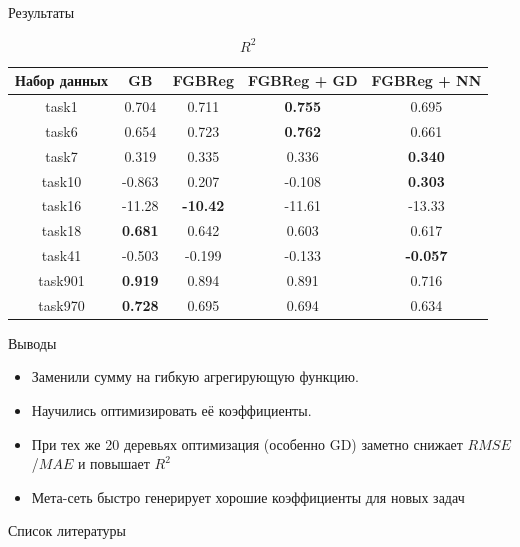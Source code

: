 \documentclass{beamer}
\begin{document}
\begin{frame}{Результаты}

\begin{table}[H]
\centering
\begin{tabular}{|c|c|c|c|c|}
    \hline
     Набор данных & GB              & FGBReg           & FGBReg + GD     & FGBReg + NN     \\
    \hline
    task1         & 0.704           & 0.711            & \textbf{0.755}  & 0.695           \\
    task6         & 0.654           & 0.723            & \textbf{0.762}  & 0.661           \\
    task7         & 0.319           & 0.335            & 0.336           & \textbf{0.340}  \\
    \hline
    task10        & -0.863          & 0.207            & -0.108          & \textbf{0.303}  \\
    task16        & -11.28          & \textbf{-10.42}  & -11.61          & -13.33          \\
    task18        & \textbf{0.681}  & 0.642            & 0.603           & 0.617           \\
    \hline
    task41        & -0.503          & -0.199           & -0.133          & \textbf{-0.057} \\
    task901       & \textbf{0.919}  & 0.894            & 0.891           & 0.716           \\
    task970       & \textbf{0.728}  & 0.695            & 0.694           & 0.634           \\
    \hline
\end{tabular}
\caption{$R^2$}
\label{tab:r2_results}
\end{table}
    
\end{frame}

\begin{frame}{Выводы}
\begin{itemize}
    \item Заменили сумму на гибкую агрегирующую функцию.
    \item Научились оптимизировать её коэффициенты.
    \item При тех же 20 деревьях оптимизация (особенно GD) заметно снижает $RMSE$/$MAE$ и повышает $R^2$
    \item Мета-сеть быстро генерирует хорошие коэффициенты для новых задач
\end{itemize}
\end{frame}

\begin{frame}[allowframebreaks]{Список литературы}
\tiny
\nocite{*}


\end{frame}
\end{document}
